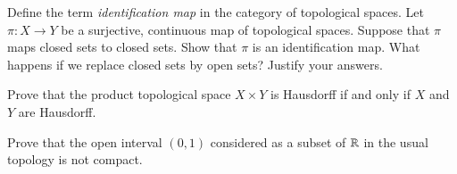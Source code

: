 \documentclass[12pt]{exam}
\theoremstyle{definition}
\newcommand{\R}{\mathcal{R}}
\def\R{{ \Bbb R}}
\begin{document}
\begin{questions}

\question


Define the term \emph{identification map} in the category of
topological spaces. Let $\pi:X \rightarrow Y$ be a surjective,
continuous map of topological spaces. Suppose that $\pi$ maps closed
sets to closed sets. Show that $\pi$ is an identification map. What
happens if we replace closed sets by open sets? Justify your
answers.




\question Prove that the product topological space $X \times Y $ is
Hausdorff if and only if $X$ and $Y$ are Hausdorff.



\question

Prove that the open interval $(0,1)$ considered as a subset of $\R$
in the usual topology is not compact.


\end{questions}
\end{document}
